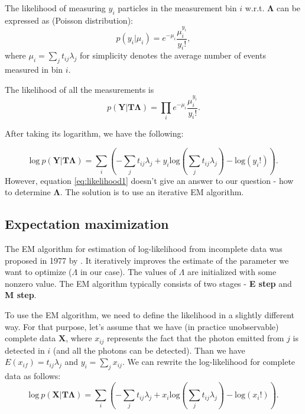The likelihood of measuring $y_{i}$ particles in the measurement bin $i$ w.r.t. $\mathbf{\Lambda}$ can be expressed as (Poisson distribution):
\begin{equation}
  p(y_{i} |\mu_{i} ) = e^{-\mu_{i}} \frac{\mu_{i}^{y_i}}{y_{i}!},
\end{equation}
where $\mu_{i} = \sum_{j} t_{ij}\lambda_{j}$ for simplicity denotes the average number of events measured in bin $i$.

The likelihood of all the measurements is
\begin{equation}  
  p(\mathbf{Y} | \mathbf{T\Lambda} ) = \prod_{i} e^{-\mu_{i}} \frac{\mu_{i}^{y_i}}{y_{i}!}.
\end{equation}

After taking its logarithm, we have the following:

\begin{equation}  
  \mathrm{log}\ p(\mathbf{Y} | \mathbf{T\Lambda} ) = \sum_{i}\left ( -\sum_{j} t_{ij}\lambda_{j} + y_{i} \mathrm{log}(\sum_{j} t_{ij}\lambda_{j})  - \mathrm{log}(y_{i}!) \right ).
  \label{eq:likelihood1}
\end{equation}
However, equation \ref{eq:likelihood1} doesn't give an answer to our question - how to determine $\mathbf{\Lambda}$. The solution is to use an iterative EM algorithm.

\subsection{Expectation maximization}
The EM algorithm for estimation of log-likelihood from incomplete data was proposed in 1977 by \cite{EM}.
It iteratively improves the estimate of the parameter we want to optimize ($\Lambda$ in our case).
The values of $\Lambda$ are initialized with some nonzero value.
The EM algorithm typically consists of two stages - \textbf{E step} and \textbf{M step}.

To use the EM algorithm, we need to define the likelihood in a slightly different way.
For that purpose, let's assume that we have (in practice unobservable) complete data $\mathbf{X}$, where $x_{ij}$ represents the fact that the photon emitted from $j$ is detected in $i$ (and all the photons can be detected).
Than we have $E(x_{if}) = t_{ij}\lambda_{j}$ and $y_{i} = \sum_{j}x_{ij}$. 
We can rewrite the log-likelihood for complete data as follows:
\begin{equation}  
  \mathrm{log}\ p(\mathbf{X} | \mathbf{T\Lambda} ) = \sum_{i}\left ( -\sum_{j} t_{ij}\lambda_{j} + x_{i} \mathrm{log}(\sum_{j} t_{ij}\lambda_{j})  - \mathrm{log}(x_{i}!) \right ).
  \label{eq:likelihood2}
\end{equation}

